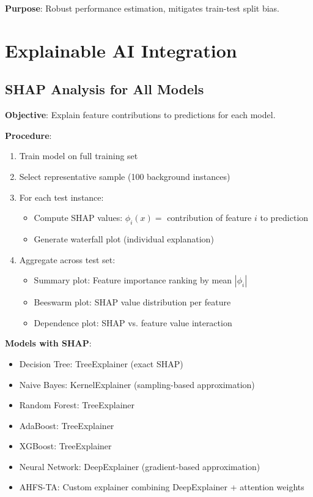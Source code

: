 \textbf{Purpose}: Robust performance estimation, mitigates train-test split bias.

\section{Explainable AI Integration}

\subsection{SHAP Analysis for All Models}

\textbf{Objective}: Explain feature contributions to predictions for each model.

\textbf{Procedure}:
\begin{enumerate}
\item Train model on full training set
\item Select representative sample (100 background instances)
\item For each test instance:
\begin{itemize}
\item Compute SHAP values: $\phi_i(x) = $ contribution of feature $i$ to prediction
\item Generate waterfall plot (individual explanation)
\end{itemize}
\item Aggregate across test set:
\begin{itemize}
\item Summary plot: Feature importance ranking by mean $|\phi_i|$
\item Beeswarm plot: SHAP value distribution per feature
\item Dependence plot: SHAP vs. feature value interaction
\end{itemize}
\end{enumerate}

\textbf{Models with SHAP}:
\begin{itemize}
\item Decision Tree: TreeExplainer (exact SHAP)
\item Naive Bayes: KernelExplainer (sampling-based approximation)
\item Random Forest: TreeExplainer
\item AdaBoost: TreeExplainer
\item XGBoost: TreeExplainer
\item Neural Network: DeepExplainer (gradient-based approximation)
\item AHFS-TA: Custom explainer combining DeepExplainer + attention weights
\end{itemize}


